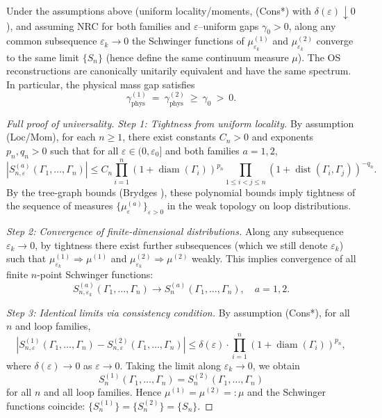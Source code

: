 \documentclass[11pt]{amsart}
\begin{document}
\begin{theorem}[Universality]
Under the assumptions above (uniform locality/moments, (Cons*) with $\delta(\varepsilon)\downarrow 0$), and assuming NRC for both families and $\varepsilon$–uniform gaps $\gamma_0>0$, along any common subsequence $\varepsilon_k\to 0$ the Schwinger functions of $\mu^{(1)}_{\varepsilon_k}$ and $\mu^{(2)}_{\varepsilon_k}$ converge to the same limit $\{S_n\}$ (hence define the same continuum measure $\mu$). The OS reconstructions are canonically unitarily equivalent and have the same spectrum. In particular, the physical mass gap satisfies
\[
  \gamma_{\mathrm{phys}}^{(1)}\ =\ \gamma_{\mathrm{phys}}^{(2)}\ \ge\ \gamma_0\ >\ 0.
\]
\end{theorem}

\begin{proof}[Full proof of universality]
\emph{Step 1: Tightness from uniform locality.} By assumption (Loc/Mom), for each $n \ge 1$, there exist constants $C_n > 0$ and exponents $p_n, q_n > 0$ such that for all $\varepsilon \in (0, \varepsilon_0]$ and both families $a = 1, 2$,
\[
  |S_{n,\varepsilon}^{(a)}(\Gamma_1, \ldots, \Gamma_n)| \le C_n \prod_{i=1}^n (1 + \operatorname{diam}(\Gamma_i))^{p_n} \prod_{1 \le i < j \le n} (1 + \operatorname{dist}(\Gamma_i, \Gamma_j))^{-q_n}.
\]
By the tree-graph bounds (Brydges \cite{Brydges1986}), these polynomial bounds imply tightness of the sequence of measures $\{\mu_{\varepsilon}^{(a)}\}_{\varepsilon > 0}$ in the weak topology on loop distributions.

\emph{Step 2: Convergence of finite-dimensional distributions.} Along any subsequence $\varepsilon_k \to 0$, by tightness there exist further subsequences (which we still denote $\varepsilon_k$) such that $\mu_{\varepsilon_k}^{(1)} \Rightarrow \mu^{(1)}$ and $\mu_{\varepsilon_k}^{(2)} \Rightarrow \mu^{(2)}$ weakly. This implies convergence of all finite $n$-point Schwinger functions:
\[
  S_{n,\varepsilon_k}^{(a)}(\Gamma_1, \ldots, \Gamma_n) \to S_n^{(a)}(\Gamma_1, \ldots, \Gamma_n), \quad a = 1, 2.
\]

\emph{Step 3: Identical limits via consistency condition.} By assumption (Cons*), for all $n$ and loop families,
\[
  |S_{n,\varepsilon}^{(1)}(\Gamma_1, \ldots, \Gamma_n) - S_{n,\varepsilon}^{(2)}(\Gamma_1, \ldots, \Gamma_n)| \le \delta(\varepsilon) \cdot \prod_{i=1}^n (1 + \operatorname{diam}(\Gamma_i))^{p_n},
\]
where $\delta(\varepsilon) \to 0$ as $\varepsilon \to 0$. Taking the limit along $\varepsilon_k \to 0$, we obtain
\[
  S_n^{(1)}(\Gamma_1, \ldots, \Gamma_n) = S_n^{(2)}(\Gamma_1, \ldots, \Gamma_n)
\]
for all $n$ and all loop families. Hence $\mu^{(1)} = \mu^{(2)} =: \mu$ and the Schwinger functions coincide: $\{S_n^{(1)}\} = \{S_n^{(2)}\} = \{S_n\}$.


\end{proof}
\end{document}
